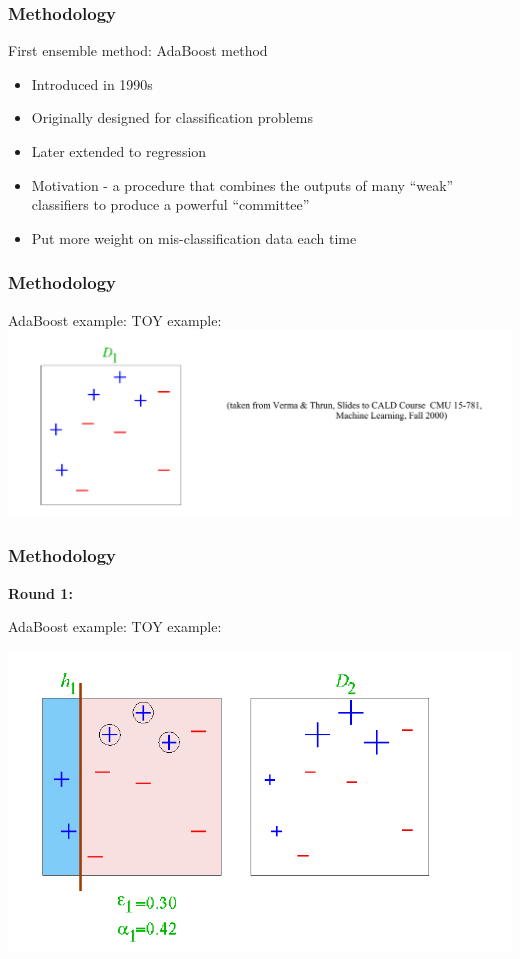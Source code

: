 \documentclass[xcolor={x11names,svgnames,dvipsnames}]{beamer}
\begin{document}
\begin{frame}
	\frametitle{Methodology}
	\begin{block}{First ensemble method: AdaBoost method}
	  \begin{itemize}
	  \item Introduced in 1990s
	  \item Originally designed for classification problems
	  \item Later extended to regression
	  \item Motivation - a procedure that \alert{combines the outputs of many “weak” classifiers to produce a powerful “committee”}	 
	  \item Put more weight on mis-classification data each time  
	  \end{itemize}
	\end{block}
\end{frame}




\begin{frame}
	\frametitle{Methodology}
	\begin{block}{AdaBoost example: TOY example:}
      \includegraphics[width=1\textwidth, height=0.5\textheight]{toy_example.png}
	\end{block}	
\end{frame}


\begin{frame}
	\frametitle{Methodology}
   \small{\textbf{Round 1:}}

	\begin{block}{AdaBoost example: TOY example:}

      \includegraphics[width=1\textwidth, height=0.6\textheight]{round_1.png}
	\end{block}	
\end{frame}
\end{document}

